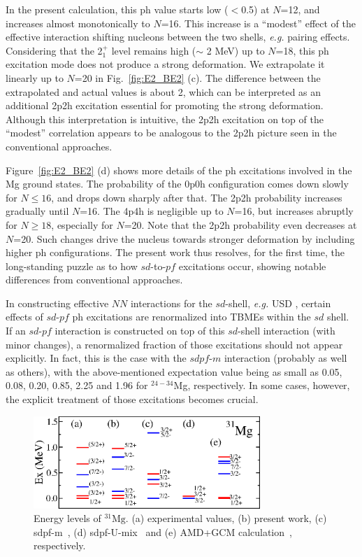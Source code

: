 \documentclass[aps,prl,twocolumn,groupedaddress,showkeys,showpacs,floatfix,superscriptaddress]{revtex4-1}
\def\Nu#1#2#3{{}^{#2}_{#3}\mathrm{#1}}
\newcommand\+{^\dagger}
\begin{document}
In the present calculation, this ph value starts low ($<$0.5) at $N$=12, and increases almost 
monotonically to $N$=16.  
This increase is a ``modest'' effect of the effective interaction shifting nucleons between the two shells, 
{\it e.g.} pairing effects. 
Considering that the 2$^+_1$ level remains high ($\sim$ 2 MeV) up to $N$=18, 
this ph excitation mode does not produce a strong deformation.
We extrapolate it linearly up to $N$=20 in Fig.~\ref{fig:E2_BE2} (c).  
The difference between the extrapolated and actual values is about 2, which can be
interpreted as an additional 2p2h excitation essential for promoting the strong deformation.
Although this interpretation is intuitive, the 2p2h excitation on top of the ``modest'' correlation 
appears to be analogous to the 2p2h picture seen in the conventional approaches.

Figure~\ref{fig:E2_BE2} (d) shows more details of the ph excitations involved in the Mg 
ground states.  The probability of the 0p0h configuration comes down slowly for $N\le 16$, and drops down
sharply after that.  The 2p2h probability increases gradually until $N$=16.  The 4p4h is negligible 
up to $N$=16, but increases abruptly for $N \ge 18$, especially for $N$=20.  
Note that the 2p2h probability even decreases at $N$=20.  
Such changes drive the nucleus towards stronger deformation  
by including higher ph configurations.   
The present work thus resolves, for the first time, the long-standing puzzle as to how 
$sd$-to-$pf$ excitations occur, showing notable differences from
conventional approaches.%

In constructing effective $NN$ interactions for the $sd$-shell, {\it e.g.} USD \cite{Brown1988191}, 
certain effects of $sd$-$pf$ ph excitations are renormalized  
into TBMEs within the $sd$ shell.  
If an $sd$-$pf$ interaction is constructed on top of this $sd$-shell
interaction (with minor changes),
a renormalized fraction of those excitations should not appear explicitly.    
In fact, this is the case with the $sdpf$-$m$ interaction (probably as well as others), 
with the above-mentioned expectation value 
being as small as 0.05, 0.08, 0.20, 0.85, 2.25 and 1.96 for $^{24-34}$Mg, respectively.
In some cases, however, the explicit treatment of those excitations becomes crucial.  

\begin{figure}[tbp]
 \includegraphics[width=8.5725cm,angle=0,clip]{Fig3.eps}
 \caption{Energy levels of $\Nu{Mg}{31}{}$. (a) experimental values, (b)
 present work, (c) sdpf-m~\cite{PhysRevC.60.054315},
 (d) sdpf-U-mix~\cite{Caurier:2013aoa} and (e)
 AMD+GCM calculation~\cite{Kimura:2007id}, respectively.}
 \label{fig:ant}
\end{figure}
\end{document}
